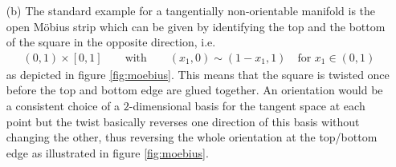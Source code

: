 \begin{exa}
\begin{enumerate}
\item[(b)]
The standard example for a tangentially non-orientable manifold is the open M{\"o}bius strip which can be given by identifying the top and the bottom of the square in the opposite direction, i.e.
\begin{align*}
  (0,1)
  \times
  [0,1]
  \qquad
  \text{with}
  \qquad
  (x_{1},0)
  \sim
  (1-x_{1},1)
  \quad
  \text{for }
  x_{1}
  \in
  (0,1)
\end{align*}
as depicted in figure \ref{fig:moebius}. This means that the square is twisted once before the top and bottom edge are glued together. An orientation would be a consistent choice of a $2$-dimensional basis for the tangent space at each point but the twist basically reverses one direction of this basis without changing the other, thus reversing the whole orientation at the top/bottom edge as illustrated in figure \ref{fig:moebius}.
\\
\begin{figure}[h!]
\centering
{}
\end{figure}
\end{enumerate}
\end{exa}
